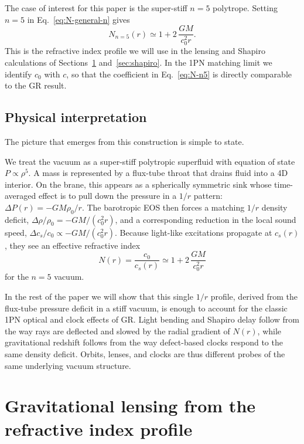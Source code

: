 \documentclass[11pt]{article}
\begin{document}
The case of interest for this paper is the super-stiff $n=5$ polytrope.
Setting $n=5$ in Eq.~\eqref{eq:N-general-n} gives
\begin{equation}
  N_{n=5}(r)
  \simeq 1 + 2\,\frac{GM}{c_0^2 r}.
  \label{eq:N-n5}
\end{equation}
This is the refractive index profile we will use in the lensing and Shapiro
calculations of Sections~\ref{sec:lensing} and~\ref{sec:shapiro}.
In the 1PN matching limit we identify $c_0$ with $c$, so that the coefficient
in Eq.~\eqref{eq:N-n5} is directly comparable to the GR result.


\subsection{Physical interpretation}
\label{subsec:n5-physics-story}

The picture that emerges from this construction is simple to state.

We treat the vacuum as a super-stiff polytropic superfluid with
equation of state $P \propto \rho^5$.
A mass is represented by a flux-tube throat that drains fluid into a 4D
interior.
On the brane, this appears as a spherically symmetric sink whose
time-averaged effect is to pull down the pressure in a $1/r$ pattern:
$\Delta P(r) = - GM \rho_0 / r$.
The barotropic EOS then forces a matching $1/r$ density deficit,
$\Delta\rho/\rho_0 = -GM/(c_0^2 r)$, and a corresponding reduction in
the local sound speed, $\Delta c_s/c_0 \propto -GM/(c_0^2 r)$.
Because light-like excitations propagate at $c_s(r)$, they see an effective
refractive index
\begin{equation}
  N(r) = \frac{c_0}{c_s(r)}
  \simeq 1 + 2\,\frac{GM}{c_0^2 r}
\end{equation}
for the $n=5$ vacuum.

In the rest of the paper we will show that this single $1/r$ profile,
derived from the flux-tube pressure deficit in a stiff vacuum, is enough to
account for the classic 1PN optical and clock effects of GR.
Light bending and Shapiro delay follow from the way rays are deflected and
slowed by the radial gradient of $N(r)$, while gravitational redshift
follows from the way defect-based clocks respond to the same density
deficit.
Orbits, lenses, and clocks are thus different probes of the same underlying
vacuum structure.

\section{Gravitational lensing from the refractive index profile}
\label{sec:lensing}
\end{document}
